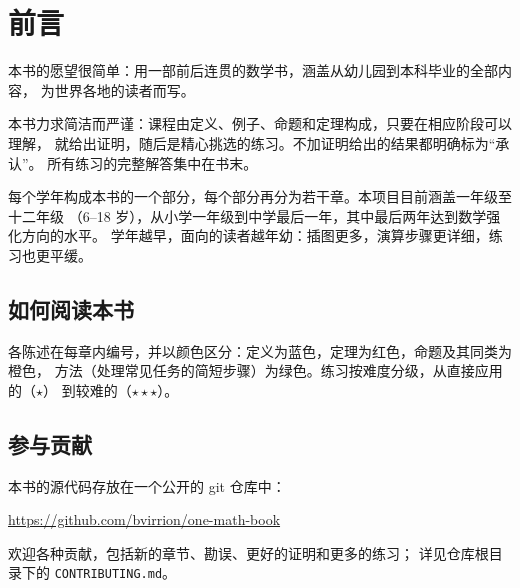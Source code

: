 \chapter{前言}

本书的愿望很简单：用一部前后连贯的数学书，涵盖从幼儿园到本科毕业的全部内容，
为世界各地的读者而写。

本书力求简洁而严谨：课程由定义、例子、命题和定理构成，只要在相应阶段可以理解，
就给出证明，随后是精心挑选的练习。不加证明给出的结果都明确标为“承认”。
所有练习的完整解答集中在书末。

每个学年构成本书的一个部分，每个部分再分为若干章。本项目目前涵盖一年级至十二年级
（6--18 岁），从小学一年级到中学最后一年，其中最后两年达到数学强化方向的水平。
学年越早，面向的读者越年幼：插图更多，演算步骤更详细，练习也更平缓。

\section*{如何阅读本书}

各陈述在每章内编号，并以颜色区分：定义为蓝色，定理为红色，命题及其同类为橙色，
方法（处理常见任务的简短步骤）为绿色。练习按难度分级，从直接应用的（$\star$）
到较难的（$\star\star\star$）。

\section*{参与贡献}

本书的源代码存放在一个公开的 git 仓库中：
\begin{center}
\url{https://github.com/bvirrion/one-math-book}
\end{center}
欢迎各种贡献，包括新的章节、勘误、更好的证明和更多的练习；
详见仓库根目录下的 \texttt{CONTRIBUTING.md}。

